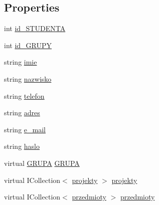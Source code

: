 \subsection*{Properties}
\begin{DoxyCompactItemize}
\item 
int \hyperlink{class_dziennik_ocen_web2_1_1_s_t_u_d_e_n_t_acf240d35c8b68ed31df2d06739310890}{id\+\_\+\+S\+T\+U\+D\+E\+N\+TA}
\item 
int \hyperlink{class_dziennik_ocen_web2_1_1_s_t_u_d_e_n_t_a698781a8da896dd749516d98be5d4aec}{id\+\_\+\+G\+R\+U\+PY}
\item 
string \hyperlink{class_dziennik_ocen_web2_1_1_s_t_u_d_e_n_t_a91a599f89743a09951a99004a9db7f0c}{imie}
\item 
string \hyperlink{class_dziennik_ocen_web2_1_1_s_t_u_d_e_n_t_abad72ed1b34a5712ce17bfbb5533237f}{nazwisko}
\item 
string \hyperlink{class_dziennik_ocen_web2_1_1_s_t_u_d_e_n_t_a12ba976fea0e37ec4954e3260784435d}{telefon}
\item 
string \hyperlink{class_dziennik_ocen_web2_1_1_s_t_u_d_e_n_t_af1c6585d2a9e498849fda99739c00d4d}{adres}
\item 
string \hyperlink{class_dziennik_ocen_web2_1_1_s_t_u_d_e_n_t_ad854b00f1295f68a2fba2f9d5854c34b}{e\+\_\+mail}
\item 
string \hyperlink{class_dziennik_ocen_web2_1_1_s_t_u_d_e_n_t_a64982475f93d726148adc59d0c8519a0}{haslo}
\item 
virtual \hyperlink{class_dziennik_ocen_web2_1_1_g_r_u_p_a}{G\+R\+U\+PA} \hyperlink{class_dziennik_ocen_web2_1_1_s_t_u_d_e_n_t_aae4984488986aa5903e5565c53c308ac}{G\+R\+U\+PA}
\item 
virtual I\+Collection$<$ \hyperlink{class_dziennik_ocen_web2_1_1projekty}{projekty} $>$ \hyperlink{class_dziennik_ocen_web2_1_1_s_t_u_d_e_n_t_a655e1a55342c3806fa104ef51b1817eb}{projekty}
\item 
virtual I\+Collection$<$ \hyperlink{class_dziennik_ocen_web2_1_1przedmioty}{przedmioty} $>$ \hyperlink{class_dziennik_ocen_web2_1_1_s_t_u_d_e_n_t_ac030db7d273dc87457ecfbf586945ea0}{przedmioty}
\end{DoxyCompactItemize}


